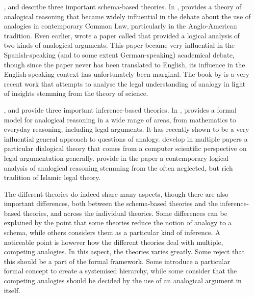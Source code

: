         	\textcite{Brewer1996}, \textcite{alchourron1991argumentos} and \textcite{woods2015legal} describe three important schema-based theories. In , \citeauthor{Brewer1996} provides a theory of analogical reasoning that became widely influential in the debate about the use of analogies in contemporary Common Law, particularly in the Anglo-American tradition. Even earlier, \citeauthor{alchourron1991argumentos} wrote a paper called  that provided a logical analysis of two kinds of analogical arguments. This paper became very influential in the Spanish-speaking (and to some extent German-speaking) academical debate, though since the paper never has been translated to English, its influence in the English-speaking context has unfortunately been marginal. The book  by \citeauthor{woods2015legal} is a very recent work that attempts to analyse the legal understanding of analogy in light of insights stemming from the theory of science. 
        	
        	\textcite{Bartha2010}, \textcite{Prakken1996} and \textcite{Rahman2017} provide three important inference-based theories. In , \citeauthor{Bartha2010} provides a formal model for analogical reasoning in a wide range of areas, from mathematics to everyday reasoning, including legal arguments. It has recently shown to be a very influential general approach to questions of analogy. \citeauthor{Prakken1996} develop in multiple papers a particular dialogical theory that comes from a computer scientific perspective on legal argumentation generally. \citeauthor{Rahman2017} provide in the paper  a contemporary logical analysis of analogical reasoning stemming from the often neglected, but rich tradition of Islamic legal theory. 
        	
        	The different theories do indeed share many aspects, though there are also important differences, both between the schema-based theories and the inference-based theories, and across the individual theories. Some differences can be explained by the point that some theories reduce the notion of analogy to a schema, while others considers them as a particular kind of inference. A noticeable point is however how the different theories deal with multiple, competing analogies. In this aspect, the theories varies greatly. Some reject that this should be a part of the formal framework. Some introduce a particular formal concept to create a systemised hierarchy, while some consider that the competing analogies should be decided by the use of an analogical argument in itself. 
        
